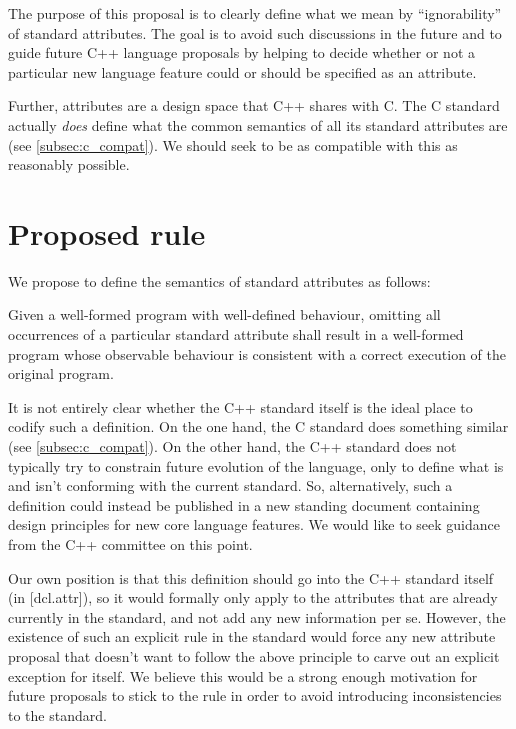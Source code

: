 The purpose of this proposal is to clearly define what we mean by ``ignorability'' of standard attributes. The goal is to avoid such discussions in the future and to guide future C++ language proposals by helping to decide whether or not a particular new language feature could or should be specified as an attribute.

Further, attributes are a design space that C++ shares with C. The C standard actually \emph{does} define what the common semantics of all its standard attributes are (see \ref{subsec:c_compat}). We should seek to be as compatible with this as reasonably possible.

\section{Proposed rule}

We propose to define the semantics of standard attributes as follows:

\begin{adjustwidth}{0.5cm}{0.5cm}
Given a well-formed program with well-defined behaviour, omitting all occurrences of a particular standard attribute shall result in a well-formed program whose observable behaviour is consistent with a correct execution of the original program.
\end{adjustwidth}

It is not entirely clear whether the C++ standard itself is the ideal place to codify such a definition. On the one hand, the C standard does something similar (see \ref{subsec:c_compat}). On the other hand, the C++ standard does not typically try to constrain future evolution of the language, only to define what is and isn't conforming with the current standard. So, alternatively, such a definition could instead be published in a new standing document containing design principles for new core language features. We would like to seek guidance from the C++ committee on this point.

Our own position is that this definition should go into the C++ standard itself (in [dcl.attr]), so it would formally only apply to the attributes that are already currently in the standard, and not add any new information per se. However, the existence of such an explicit rule in the standard would force any new attribute proposal that doesn't want to follow the above principle to carve out an explicit exception for itself. We believe this would be a strong enough motivation for future proposals to stick to the rule in order to avoid introducing inconsistencies to the standard.

